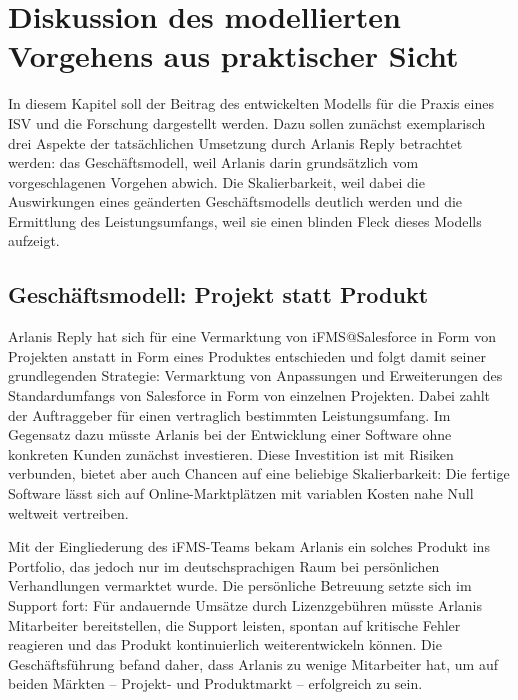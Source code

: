 \section{Diskussion des modellierten Vorgehens aus praktischer Sicht}
\label{cha:diskussion}
\begin{comment}
Im vorletzten Abschnitt diskutieren Sie Ihre Ergebnisse und stellen den Beitrag 
für die Praxis und für die Forschung dar. Gehen Sie auch auf die Einschränkungen 
Ihrer Arbeit ein.
\end{comment}
In diesem Kapitel soll der Beitrag des entwickelten Modells für die Praxis eines ISV und 
die Forschung dargestellt werden. Dazu sollen zunächst exemplarisch drei 
Aspekte der tatsächlichen Umsetzung durch Arlanis Reply betrachtet werden: das 
Geschäftsmodell, weil Arlanis darin grundsätzlich vom vorgeschlagenen Vorgehen 
abwich. Die Skalierbarkeit, weil dabei die Auswirkungen eines geänderten 
Geschäftsmodells deutlich werden und die Ermittlung des Leistungsumfangs, weil 
sie einen blinden Fleck dieses Modells aufzeigt.

\subsection{Geschäftsmodell: Projekt statt Produkt}
Arlanis Reply hat sich für eine Vermarktung von iFMS@Salesforce in Form von 
Projekten anstatt in Form eines Produktes entschieden und folgt damit seiner 
grundlegenden Strategie: Vermarktung von Anpassungen und Erweiterungen des 
Standardumfangs von Salesforce in Form von einzelnen Projekten. Dabei zahlt der 
Auftraggeber für einen vertraglich bestimmten Leistungsumfang. Im Gegensatz 
dazu müsste Arlanis bei der Entwicklung einer Software ohne konkreten Kunden 
zunächst investieren. Diese Investition ist mit Risiken verbunden, bietet aber 
auch Chancen auf eine beliebige Skalierbarkeit: Die fertige Software lässt 
sich auf Online-Marktplätzen mit variablen Kosten nahe Null weltweit vertreiben.

Mit der Eingliederung des iFMS-Teams bekam Arlanis ein solches Produkt ins 
Portfolio, das jedoch nur im deutschsprachigen Raum bei persönlichen 
Verhandlungen vermarktet wurde. Die persönliche Betreuung setzte sich im 
Support fort: Für andauernde Umsätze durch Lizenzgebühren müsste Arlanis 
Mitarbeiter bereitstellen, die Support leisten, spontan auf kritische Fehler 
reagieren und das Produkt kontinuierlich weiterentwickeln können. Die 
Geschäftsführung befand daher, dass Arlanis zu wenige Mitarbeiter hat, um auf 
beiden Märkten -- Projekt- und Produktmarkt -- erfolgreich zu sein.

